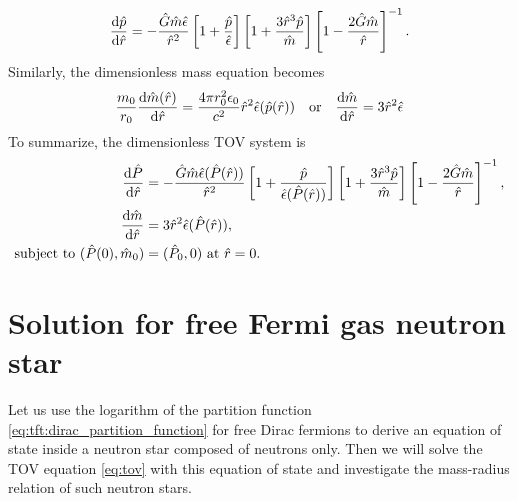 \begin{equation}
	\odv{\diml{p}}{\diml{r}} = - \frac{\diml{G} \diml{m} \diml{\epsilon}}{\diml{r}^2} \left[ 1 + \frac{\diml{p}}{\diml{\epsilon}} \right] \left[ 1 + \frac{3 \diml{r}^3 \diml{p}}{\diml{m}} \right] \left[ 1 - \frac{2 \diml{G} \diml{m}}{\diml{r}} \right]^{-1}.
\end{equation}
Similarly, the dimensionless mass equation becomes
\begin{equation}
	\frac{m_0}{r_0} \odv{\diml{m}(\diml{r})}{\diml{r}} = \frac{4 \pi r_0^2 \epsilon_0}{c^2} \diml{r}^2\diml{\epsilon}(\diml{p}(\diml{r}))
	\quad \text{or} \quad
	\odv{\diml{m}}{\diml{r}} = 3 \diml{r}^2 \diml{\epsilon}
\end{equation}
To summarize, the dimensionless TOV system is
\begin{equation}
\begin{split}
	\odv{\diml{P}}{\diml{r}} &= - \frac{\diml{G} \diml{m} \diml{\epsilon}(\diml{P}(\diml{r}))}{\diml{r}^2} \left[ 1 + \frac{\diml{p}}{\diml{\epsilon}(\diml{P}(\diml{r}))} \right] \left[ 1 + \frac{3 \diml{r}^3 \diml{p}}{\diml{m}} \right] \left[ 1 - \frac{2 \diml{G} \diml{m}}{\diml{r}} \right]^{-1}, \\
	\odv{\diml{m}}{\diml{r}} &= 3 \diml{r}^2 \diml{\epsilon}(\diml{P}(\diml{r})), \\
	\text{subject to } (\diml{P}(0), \diml{m}_0) &= (\diml{P}_0, 0) \text{ at $\diml{r} = 0$}.
\end{split}
\end{equation}

\section{Solution for free Fermi gas neutron star}

Let us use the logarithm of the partition function \eqref{eq:tft:dirac_partition_function} for free Dirac fermions to derive an equation of state inside a neutron star composed of neutrons only.
Then we will solve the TOV equation \eqref{eq:tov} with this equation of state and investigate the mass-radius relation of such neutron stars.

